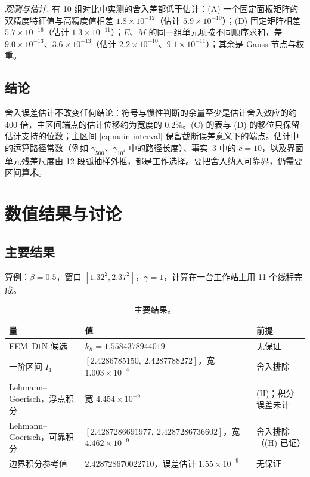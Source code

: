 \documentclass[11pt,a4paper,fontset=fandol]{ctexart}
\theoremstyle{plain}
\theoremstyle{definition}
\theoremstyle{remark}
\begin{document}
\emph{观测与估计.} 有 10 组对比中实测的舍入差都低于估计：(A) 一个固定面板矩阵的双精度特征值与高精度值相差 $1.8\times10^{-12}$（估计 $5.9\times10^{-10}$）；(D) 固定矩阵相差 $5.7\times10^{-16}$（估计 $1.3\times10^{-11}$）；$E$、$M$ 的同一组单元项按不同顺序求和，差 $9.0\times10^{-13}$、$3.6\times10^{-13}$（估计 $2.2\times10^{-10}$、$9.1\times10^{-11}$）；其余是 Gauss 节点与权重。

\subsection{结论}

舍入误差估计不改变任何结论：符号与惯性判断的余量至少是估计舍入效应的约 400 倍，主区间端点的估计位移约为宽度的 $0.2\%$。(C) 的表与 (D) 的移位只保留估计支持的位数；主区间 \eqref{eq:main-interval} 保留截断误差意义下的端点。估计中的运算路径常数（例如 $\gamma_{500}$、$\gamma_{10^4}$ 中的路径长度）、事实~3 中的 $c=10$，以及界面单元残差尺度由 12 段弧抽样外推，都是工作选择。要把舍入纳入可靠界，仍需要区间算术。

\section{数值结果与讨论}
\label{sec:results}
\subsection{主要结果}

算例：$\beta=0.5$，窗口 $[1.32^2,2.37^2]$，$\gamma=1$，计算在一台工作站上用 11 个线程完成。

\begin{table}[h]
\centering
\small
\caption{主要结果。}
\label{tab:results}
\begin{tabular}{>{\raggedright\arraybackslash}p{4.4cm}>{\raggedright\arraybackslash}p{6.0cm}>{\raggedright\arraybackslash}p{3.2cm}}
\toprule
量 & 值 & 前提 \\
\midrule
FEM--DtN 候选 & $k_h=1.5584378944019$ & 无保证 \\
一阶区间 $I_1$ & $[2.4286785150,\ 2.4287788272]$，宽 $1.003\times10^{-4}$ & 舍入排除 \\
Lehmann--Goerisch，浮点积分 & 宽 $4.454\times10^{-9}$ & (H)；积分误差未计 \\
Lehmann--Goerisch，可靠积分 & $[2.4287286691977,\ 2.4287286736602]$，宽 $4.462\times10^{-9}$ & 舍入排除（(H) 已证） \\
边界积分参考值 & $2.428728670022710$，误差估计 $1.55\times10^{-9}$ & 无保证 \\
\bottomrule
\end{tabular}
\end{table}
\end{document}

